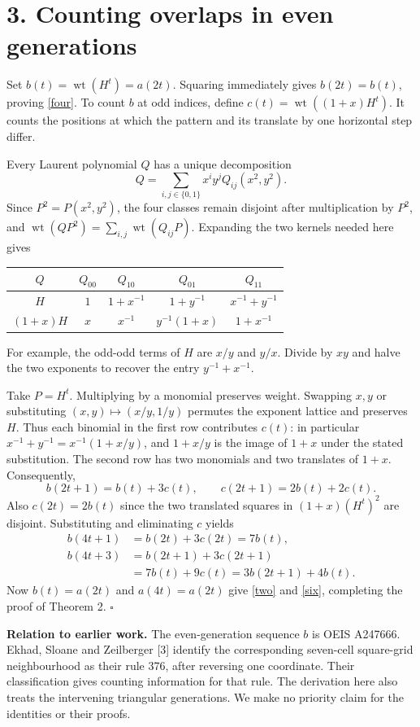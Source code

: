 \documentclass[12pt,a4paper]{article}
\newcommand{\wt}{\operatorname{wt}}
\newcommand{\stmt}[1]{\textbf{\color{accent}#1}\enspace}
\begin{document}
\newpage
\section*{3. Counting overlaps in even generations}
Set $b(t)=\wt(H^t)=a(2t)$. Squaring immediately gives $b(2t)=b(t)$, proving \eqref{four}. To count $b$ at odd indices, define $c(t)=\wt((1+x)H^t)$. It counts the positions at which the pattern and its translate by one horizontal step differ.

Every Laurent polynomial $Q$ has a unique decomposition
\[
 Q=\sum_{i,j\in\{0,1\}}x^iy^j Q_{ij}(x^2,y^2).
\]
Since $P^2=P(x^2,y^2)$, the four classes remain disjoint after multiplication by $P^2$, and $\wt(QP^2)=\sum_{i,j}\wt(Q_{ij}P)$. Expanding the two kernels needed here gives
\begin{center}
\begin{tabular}{ccccc}\toprule
$Q$ & $Q_{00}$ & $Q_{10}$ & $Q_{01}$ & $Q_{11}$\\\midrule
$H$ & $1$ & $1+x^{-1}$ & $1+y^{-1}$ & $x^{-1}+y^{-1}$\\[2pt]
$(1+x)H$ & $x$ & $x^{-1}$ & $y^{-1}(1+x)$ & $1+x^{-1}$\\\bottomrule
\end{tabular}
\end{center}
For example, the odd-odd terms of $H$ are $x/y$ and $y/x$. Divide by $xy$ and halve the two exponents to recover the entry $y^{-1}+x^{-1}$.

Take $P=H^t$. Multiplying by a monomial preserves weight. Swapping $x,y$ or substituting $(x,y)\mapsto(x/y,1/y)$ permutes the exponent lattice and preserves $H$. Thus each binomial in the first row contributes $c(t)$: in particular $x^{-1}+y^{-1}=x^{-1}(1+x/y)$, and $1+x/y$ is the image of $1+x$ under the stated substitution. The second row has two monomials and two translates of $1+x$. Consequently,
\[
 b(2t+1)=b(t)+3c(t),\qquad c(2t+1)=2b(t)+2c(t).
\]
Also $c(2t)=2b(t)$ since the two translated squares in $(1+x)(H^t)^2$ are disjoint. Substituting and eliminating $c$ yields
\begin{align*}
 b(4t+1)&=b(2t)+3c(2t)=7b(t),\\
 b(4t+3)&=b(2t+1)+3c(2t+1)\\
        &=7b(t)+9c(t)=3b(2t+1)+4b(t).
\end{align*}
Now $b(t)=a(2t)$ and $a(4t)=a(2t)$ give \eqref{two} and \eqref{six}, completing the proof of Theorem 2. \hfill$\square$

\stmt{Relation to earlier work.} The even-generation sequence $b$ is OEIS A247666. Ekhad, Sloane and Zeilberger [3] identify the corresponding seven-cell square-grid neighbourhood as their rule 376, after reversing one coordinate. Their classification gives counting information for that rule. The derivation here also treats the intervening triangular generations. We make no priority claim for the identities or their proofs.
\end{document}
